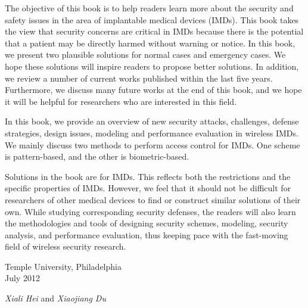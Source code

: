 \preface

The objective of this book is to help readers learn more about the security and safety issues in the area of implantable medical devices (IMDs). This book takes the view that security concerns are critical in IMDs because there is the potential that a patient may be directly harmed without warning or notice. In this book, we present two plausible solutions for normal cases and emergency cases. We hope these solutions will inspire readers to propose better solutions. In addition, we review a number of current works published within the last five years.
Furthermore, we discuss many future works at the end of this book,
and we hope it will be helpful for researchers who are interested in this field.

In this book, we provide an overview of new security attacks,
challenges, defense strategies, design issues, modeling and performance
evaluation in wireless IMDs. We mainly discuss two methods to perform access control for IMDs. One scheme is pattern-based, and the other is biometric-based.

Solutions in the book are for IMDs. This reflects both the restrictions and the specific properties of IMDs. However, we feel that it should not be difficult for researchers of other medical devices to find or
construct similar solutions of their own. While studying
corresponding security defenses, the readers will also learn the
methodologies and tools of designing security schemes, modeling,
security analysis, and performance evaluation, thus keeping pace
with the fast-moving field of wireless security research.



\vspace{\baselineskip}
\begin{flushleft}\noindent
Temple University, Philadelphia\\
July 2012\\
\end{flushleft}
\begin{flushright}
{\it Xiali Hei} and {\it Xiaojiang Du}
\end{flushright}
